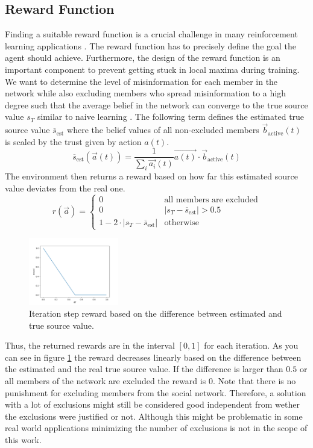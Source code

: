\documentclass[11pt, a4paper]{article}
\begin{document}
\subsection{Reward Function}
Finding a suitable reward function is a crucial challenge in many reinforcement learning applications \cite{rlblogpost}. The reward function has to precisely define the goal the agent should achieve. Furthermore, the design of the reward function is an important component to prevent getting stuck in local maxima during training. \newline
We want to determine the level of misinformation for each member in the network while also excluding members who spread misinformation to a high degree such that the average belief in the network can converge to the true source value $s_T$ similar to naive learning \cite{NaiveLearning1}. The following term defines the estimated true source value $\overline{s}_{\text{est}}$ where the belief values of all non-excluded members $\vec{b}_{\text{active}}(t)$ is scaled by the trust given by action $a(t)$.
%
\begin{equation} \label{equ:s_est}
	\overline{s}_{\text{est}}(\vec{a}(t))=\frac{1}{\sum_{i}^{}\vec{a_i}(t)} \vec{a(t)} \cdot \vec{b}_{\text{active}}(t)
\end{equation}
%
The environment then returns a reward based on how far this estimated source value deviates from the real one.
%
\begin{equation}
	r(\vec{a})= \begin{cases}
		0 & \text{all members are excluded}\\
		0 & |s_T-\overline{s}_{\text{est}}|>0.5\\
		1-2 \cdot |s_T-\overline{s}_{\text{est}}| & \text{otherwise}
	\end{cases}
\end{equation} 
%
\begin{figure}
	\centering
	\includegraphics[width=0.35\textwidth]{reward_func.png}
	\caption{\label{fig:reward_func}Iteration step reward based on the difference between estimated and true source value.}
\end{figure}
%
Thus, the returned rewards are in the interval $[0,1]$ for each iteration. As you can see in figure \ref{fig:reward_func} the reward decreases linearly based on the difference between the estimated and the real true source value. If the difference is larger than $0.5$ or all members of the network are excluded the reward is $0$. Note that there is no punishment for excluding members from the social network. Therefore, a solution with a lot of exclusions might still be considered good independent from wether the exclusions were justified or not. Although this might be problematic in some real world applications minimizing the number of exclusions is not in the scope of this work. \newline
\end{document}

